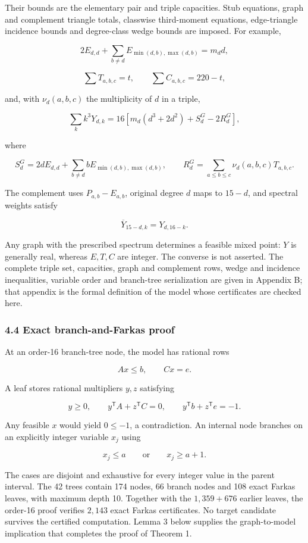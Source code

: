 \documentclass[
  english,
  11pt,
  a4paper,
]{article}
\begin{document}
Their bounds are the elementary pair and triple capacities. Stub
equations, graph and complement triangle totals, classwise third-moment
equations, edge-triangle incidence bounds and degree-class wedge bounds
are imposed. For example,

\[
2E_{d,d}+\sum_{b\ne d}E_{\min(d,b),\max(d,b)}=m_dd,
\tag{4.2}
\]

\[
\sum T_{a,b,c}=t,
\qquad
\sum C_{a,b,c}=220-t,
\tag{4.3}
\]

and, with \(\nu_d(a,b,c)\) the multiplicity of \(d\) in a triple,

\[
\sum_kk^3Y_{d,k}
=16\left[m_d(d^3+2d^2)+S_d^G-2R_d^G\right],
\tag{4.4}
\]

where

\[
S_d^G=2dE_{d,d}+\sum_{b\ne d}bE_{\min(d,b),\max(d,b)},
\qquad
R_d^G=\sum_{a\le b\le c}\nu_d(a,b,c)T_{a,b,c}.
\]

The complement uses \(P_{a,b}-E_{a,b}\), original degree \(d\) maps to
\(15-d\), and spectral weights satisfy

\[
\overline Y_{15-d,k}=Y_{d,16-k}.
\tag{4.5}
\]

Any graph with the prescribed spectrum determines a feasible mixed
point: \(Y\) is generally real, whereas \(E,T,C\) are integer. The
converse is not asserted. The complete triple set, capacities, graph and
complement rows, wedge and incidence inequalities, variable order and
branch-tree serialization are given in Appendix B; that appendix is the
formal definition of the model whose certificates are checked here.

\subsubsection{4.4 Exact branch-and-Farkas
proof}\label{exact-branch-and-farkas-proof}

At an order-16 branch-tree node, the model has rational rows

\[
Ax\le b,
\qquad
Cx=e.
\]

A leaf stores rational multipliers \(y,z\) satisfying

\[
y\ge0,
\qquad
y^{\mathsf T}A+z^{\mathsf T}C=0,
\qquad
y^{\mathsf T}b+z^{\mathsf T}e=-1.
\tag{4.6}
\]

Any feasible \(x\) would yield \(0\le-1\), a contradiction. An internal
node branches on an explicitly integer variable \(x_j\) using

\[
x_j\le a
\qquad\text{or}\qquad
x_j\ge a+1.
\tag{4.7}
\]

The cases are disjoint and exhaustive for every integer value in the
parent interval. The 42 trees contain 174 nodes, 66 branch nodes and 108
exact Farkas leaves, with maximum depth 10. Together with the
\(1{,}359+676\) earlier leaves, the order-16 proof verifies \(2{,}143\)
exact Farkas certificates. No target candidate survives the certified
computation. Lemma 3 below supplies the graph-to-model implication that
completes the proof of Theorem 1.
\end{document}
